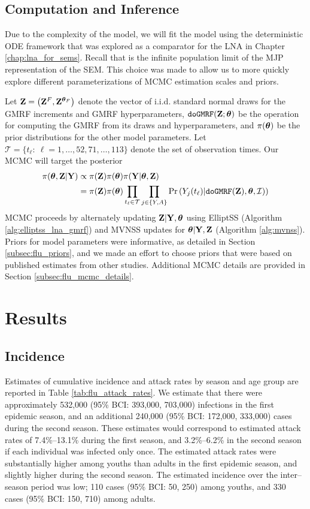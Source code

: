 \subsection{Computation and Inference}
\label{subsec:flu_mcmc}

Due to the complexity of the model, we will fit the model using the deterministic ODE framework that was explored as a comparator for the LNA in Chapter \ref{chap:lna_for_sems}. Recall that is the infinite population limit of the MJP representation of the SEM. This choice was made to allow us to more quickly explore different parameterizations of MCMC estimation scales and priors.  

Let $ \mathbf{Z} = \left (\mathbf{Z}^F,\mathbf{Z}^{\boldsymbol{\theta}_F}\right ) $ denote the vector of i.i.d. standard normal draws for the GMRF increments and GMRF hyperparameters, $ \texttt{doGMRF}(\mathbf{Z};\boldsymbol{\theta}) $ be the operation for computing the GMRF from its draws and hyperparameters, and $ \pi(\boldsymbol{\theta}) $ be the prior distributions for the other model parameters. Let $ \mathcal{T} = \lbrace t_\ell:\ \ell = 1,\dots,52,71,\dots,113 \rbrace $ denote the set of observation times. Our MCMC will target the posterior
\begin{align}
\label{eqn:flu_posterior}
\pi(\boldsymbol{\theta},\mathbf{Z} | \mathbf{Y}) &\propto \pi(\mathbf{Z})\pi(\boldsymbol{\theta})\pi(\mathbf{Y}|\boldsymbol{\theta},\mathbf{Z}) \nonumber\\
&= \pi(\mathbf{Z})\pi(\boldsymbol{\theta}) \prod_{t_\ell\in\mathcal{T}}\prod_{j\in\lbrace Y,A\rbrace} \Pr\left (Y_{j}(t_\ell) | \texttt{doGMRF}(\mathbf{Z}),\boldsymbol{\theta},\mathcal{I})\right )
\end{align}
MCMC proceeds by alternately updating $ \mathbf{Z}|\mathbf{Y},\boldsymbol{\theta} $ using ElliptSS (Algorithm \ref{alg:elliptss_lna_gmrf}) and MVNSS updates for $ \boldsymbol{\theta}|\mathbf{Y},\mathbf{Z} $ (Algorithm \ref{alg:mvnss}). Priors for model parameters were informative, as detailed in Section \ref{subsec:flu_priors}, and we made an effort to choose priors that were based on published estimates from other studies. Additional MCMC details are provided in Section \ref{subsec:flu_mcmc_details}. 

\section{Results}
\label{sec:flu_results}

\subsection{Incidence}
\label{subsec:flu_incid_res}
Estimates of cumulative incidence and attack rates by season and age group are reported in Table \ref{tab:flu_attack_rates}. We estimate that there were approximately 532,000 (95\% BCI: 393,000, 703,000) infections in the first epidemic season, and an additional 240,000 (95\% BCI: 172,000, 333,000) cases during the second season. These estimates would correspond to estimated attack rates of 7.4\%--13.1\% during the first season, and 3.2\%--6.2\% in the second season if each individual was infected only once. The estimated attack rates were substantially higher among youths than adults in the first epidemic season, and slightly higher during the second season. The estimated incidence over the inter--season period was low; 110 cases (95\% BCI: 50, 250) among youths, and 330 cases (95\% BCI: 150, 710) among adults. 

